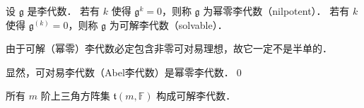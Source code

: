 
\begin{definition}
设 $\mathfrak{g}$ 是李代数．
若有 $k$ 使得 $\mathfrak{g}^k=0$，则称 $\mathfrak{g}$ 为{\heiti 幂零李代数}（nilpotent）．
若有 $k$ 使得 $\mathfrak{g}^{(k)}=0$，则称 $\mathfrak{g}$ 为{\heiti 可解李代数}（solvable）．
\end{definition}

由于可解（幂零）李代数必定包含非零可对易理想，故它一定不是半单的．

\begin{example}
显然，可对易李代数（Abel李代数）是幂零李代数．\qed
\end{example}

\begin{example}
    所有 $m$ 阶上三角方阵集 $\mathfrak{t}(m, \mathbb{F})$ 构成可解李代数．
\end{example}

